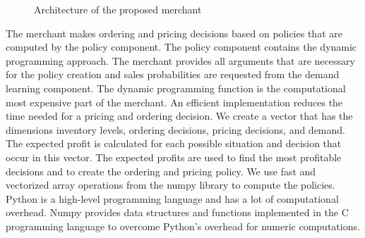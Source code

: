 \begin{figure}[t]
\centering
{}
\caption{Architecture of the proposed merchant}
\label{fig:merchant_architecture}
\end{figure}
\egroup

The merchant makes ordering and pricing decisions based on policies that are computed by the policy component.
The policy component contains the dynamic programming approach.
The merchant provides all arguments that are necessary for the policy creation and sales probabilities are requested from the demand learning component.
The dynamic programming function is the computational most expensive part of the merchant.
An efficient implementation reduces the time needed for a pricing and ordering decision.
We create a vector that has the dimensions inventory levels, ordering decisions, pricing decisions, and demand.
The expected profit is calculated for each possible situation and decision that occur in this vector.
The expected profits are used to find the most profitable decisions and to create the ordering and pricing policy.
We use fast and vectorized array operations from the numpy library to compute the policies.
Python is a high-level programming language and has a lot of computational overhead.
Numpy provides data structures and functions implemented in the C programming language to overcome Python's overhead for numeric computations.

